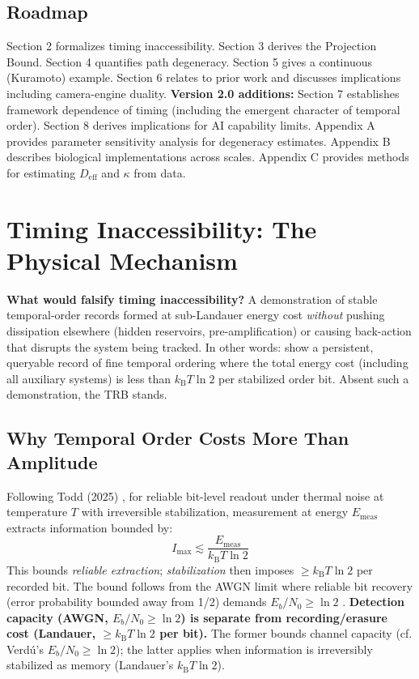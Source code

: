 \documentclass[12pt]{article}
\numberwithin{equation}{section}
\newcommand{\kB}{k_{\mathrm{B}}}
\begin{document}
\subsection{Roadmap}

Section 2 formalizes timing inaccessibility. Section 3 derives the Projection Bound. Section 4 quantifies path degeneracy. Section 5 gives a continuous (Kuramoto) example. Section 6 relates to prior work and discusses implications including camera-engine duality. \textbf{Version 2.0 additions:} Section 7 establishes framework dependence of timing (including the emergent character of temporal order). Section 8 derives implications for AI capability limits. Appendix A provides parameter sensitivity analysis for degeneracy estimates. Appendix B describes biological implementations across scales. Appendix C provides methods for estimating $D_{\mathrm{eff}}$ and $\kappa$ from data.

\section{Timing Inaccessibility: The Physical Mechanism}

\textbf{What would falsify timing inaccessibility?} A demonstration of stable temporal-order records formed at sub-Landauer energy cost \emph{without} pushing dissipation elsewhere (hidden reservoirs, pre-amplification) or causing back-action that disrupts the system being tracked. In other words: show a persistent, queryable record of fine temporal ordering where the total energy cost (including all auxiliary systems) is less than $\kB T\ln 2$ per stabilized order bit. Absent such a demonstration, the TRB stands.

\subsection{Why Temporal Order Costs More Than Amplitude}

Following Todd (2025) \cite{todd2025biosystems}, for reliable bit-level readout under thermal noise at temperature $T$ with irreversible stabilization, measurement at energy $E_{\text{meas}}$ extracts information bounded by:
\begin{equation}
I_{\max} \lesssim \frac{E_{\text{meas}}}{\kB T\ln 2}
\end{equation}
This bounds \emph{reliable extraction}; \emph{stabilization} then imposes $\ge \kB T\ln 2$ per recorded bit. The bound follows from the AWGN limit where reliable bit recovery (error probability bounded away from 1/2) demands $E_b/N_0 \ge \ln 2$ \cite{verdu2002,coverthomas}. \textbf{Detection capacity (AWGN, $E_b/N_0\ge \ln 2$) is separate from recording/erasure cost (Landauer, $\ge \kB T\ln 2$ per bit).} The former bounds channel capacity (cf. Verdú's $E_b/N_0 \ge \ln 2$); the latter applies when information is irreversibly stabilized as memory (Landauer's $\kB T\ln 2$).
\end{document}
